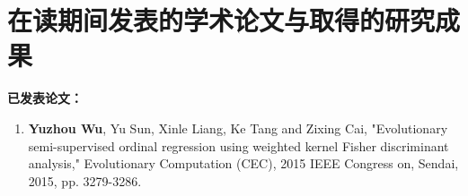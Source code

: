 ﻿
\chapter{在读期间发表的学术论文与取得的研究成果}






\noindent\textbf{已发表论文：}

\begin{enumerate}

\item \textbf{Yuzhou Wu}, Yu Sun, Xinle Liang, Ke Tang and Zixing Cai, "Evolutionary semi-supervised ordinal regression using weighted kernel Fisher discriminant analysis," Evolutionary Computation (CEC), 2015 IEEE Congress on, Sendai, 2015, pp. 3279-3286.


\end{enumerate}





